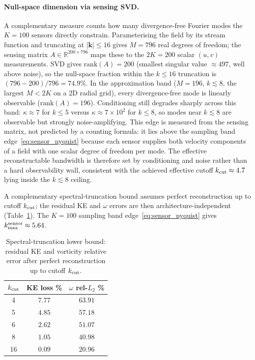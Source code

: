 \paragraph{Null-space dimension via sensing SVD.}
A complementary measure counts how many divergence-free Fourier modes the $K=100$ sensors directly constrain. Parameterising the field by its stream function and truncating at $|\mathbf{k}|\le 16$ gives $M = 796$ real degrees of freedom; the sensing matrix $A\in\mathbb{R}^{200\times 796}$ maps these to the $2K=200$ scalar $(u,v)$ measurements. SVD gives $\mathrm{rank}(A) = 200$ (smallest singular value $\approx 497$, well above noise), so the null-space fraction within the $k\le 16$ truncation is $(796-200)/796 = 74.9\%$. In the approximation band ($M=196$, $k\lesssim 8$, the largest $M<2K$ on a 2D radial grid), every divergence-free mode is linearly observable ($\mathrm{rank}(A)=196$). Conditioning still degrades sharply across this band: $\kappa\approx 7$ for $k\le 5$ versus $\kappa\approx 7\times 10^{2}$ for $k\le 8$, so modes near $k\lesssim 8$ are observable but strongly noise-amplifying. This edge is measured from the sensing matrix, not predicted by a counting formula: it lies above the sampling band edge~\eqref{eq:sensor_nyquist} because each sensor supplies both velocity components of a field with one scalar degree of freedom per mode. The effective reconstructable bandwidth is therefore set by conditioning and noise rather than a hard observability wall, consistent with the achieved effective cutoff $k_{\rm cut}\approx 4.7$ lying inside the $k\lesssim 8$ ceiling.

A complementary spectral-truncation bound assumes perfect reconstruction up to cutoff $k_{\rm cut}$; the residual KE and $\omega$ errors are then architecture-independent (Table~\ref{tab:spectral_truncation}). The $K=100$ sampling band edge~\eqref{eq:sensor_nyquist} gives $k_{\max}^{\rm sensor} \approx 5.64$.

\begin{table}[!htbp]
    \centering
    \caption{Spectral-truncation lower bound: residual KE and vorticity relative error after perfect reconstruction up to cutoff $k_{\rm cut}$.}
    \label{tab:spectral_truncation}
    \small
    \setlength{\tabcolsep}{8pt}
    \begin{tabular}{ccc}
    \toprule
    \textbf{$k_{\rm cut}$} & \textbf{KE loss \%} & \textbf{$\omega$ rel-$L_2$ \%} \\
    \midrule
    4  & $7.77$ & $63.91$ \\
    5  & $4.85$ & $57.18$ \\
    6  & $2.62$ & $51.07$ \\
    8  & $1.05$ & $40.98$ \\
    16 & $0.09$ & $20.96$ \\
    \bottomrule
    \end{tabular}
\end{table}

